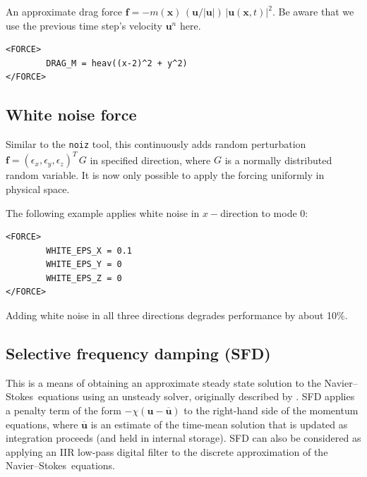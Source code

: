 \documentclass[11pt]{report}
\newcommand\NavSto{Navier--Stokes}
\begin{document}
An approximate drag force
$\bm{f} = - m(\bm{x}) \, (\bm{u}/|\bm{u}|)\, |\bm{u}(\bm{x},
t)|^2$.
Be aware that we use the previous time step's velocity $\bm{u}^{n}$ here.
\begin{verbatim}
<FORCE>
        DRAG_M = heav((x-2)^2 + y^2)
</FORCE>
\end{verbatim}

\subsection{White noise force}

Similar to the \verb+noiz+ tool, this continuously adds random
perturbation $\bm{f} = (\epsilon_x, \epsilon_y, \epsilon_z)^T\,G$ in
specified direction, where $G$ is a normally distributed random
variable.  It is now only possible to apply the forcing uniformly in
physical space.

The following example applies white noise in $x-$direction to mode 0:
\begin{verbatim}
<FORCE>
        WHITE_EPS_X = 0.1
        WHITE_EPS_Y = 0
        WHITE_EPS_Z = 0
</FORCE>
\end{verbatim}
Adding white noise in all three directions degrades performance by
about 10\%. 

\subsection{Selective frequency damping (SFD)}
\label{sec.sfd}

This is a means of obtaining an approximate steady state solution to
the \NavSto\ equations using an unsteady solver, originally described
by \citet{abhhms06}. SFD applies a penalty term of the form
$-\chi(\bm{u}-\overline{\bm{u}})$ to the right-hand side of the
momentum equations, where $\overline{\bm{u}}$ is an estimate of the
time-mean solution that is updated as integration proceeds (and held
in internal storage). SFD can also be considered as applying an IIR
low-pass digital filter to the discrete approximation of the
\NavSto\ equations.
\end{document}
